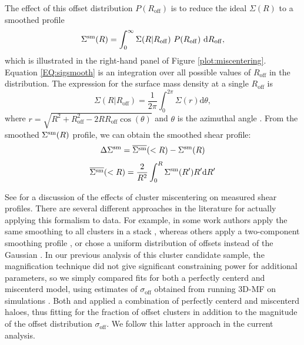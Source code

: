 The effect of this offset distribution $P(R_{\mathrm{off}})$ is to reduce the ideal $\Sigma(R)$ to a smoothed profile \citep[see e.g.][]{Johnston07,George12}
\begin{equation}
\label{EQ:sigsmooth}
\Sigma^{\rm sm}(R)=\int_{0}^{\infty} \Sigma(R|R_{\mathrm{off}})\ P(R_{\mathrm{off}})\ \mathrm{d}R_{\mathrm{off}},
\end{equation}
which is illustrated in the right-hand panel of Figure \ref{plot:miscentering}. Equation \ref{EQ:sigsmooth} is an integration over all possible values of $R_{\mathrm{off}}$ in the distribution. The expression for the surface mass density at a single $R_{\mathrm{off}}$ is
\begin{equation}
\Sigma(R|R_{\mathrm{off}})=\frac{1}{2\pi}\int_{0}^{2\pi}\Sigma(r) \mathrm{d}\theta,
\end{equation}
where $r = \sqrt{R^2+R_{\mathrm{off}}^2-2RR_{\mathrm{off}}\cos(\theta)}$ and $\theta$ is the azimuthal angle \citep{Yang06}. From the smoothed $\Sigma^{\rm sm}(R)$ profile, we can obtain the smoothed shear profile:
\begin{equation}
\Delta\Sigma^{\rm sm} = \overline{\Sigma^{\rm sm}}(<R) - \Sigma^{\rm sm}(R)
\end{equation}
\begin{equation}
\overline{\Sigma^{\rm sm}}(<R) = \frac{2}{R^2} \int_{0}^{R} \Sigma^{\rm sm}(R')R'\mathrm{d}R'
\end{equation}

See \citet{George12} for a discussion of the effects of cluster miscentering on measured shear profiles. There are several different approaches in the literature for actually applying this formalism to data. For example, in some work authors apply the same smoothing to all clusters in a stack \citep{George12}, whereas others apply a two-component smoothing profile \citep{Oguri14}, or chose a uniform distribution of offsets instead of the Gaussian \citep{Sehgal13}. In our previous analysis of this cluster candidate sample, the magnification technique did not give significant constraining power for additional parameters, so we simply compared fits for both a perfectly centerd and miscenterd model, using estimates of $\sigma_{\mathrm{off}}$ obtained from running \ac{3D-MF} on simulations \citep{Ford14}. Both \citet{Johnston07} and \citet{Covone14} applied a combination of perfectly centerd and miscenterd haloes, thus fitting for the fraction of offset clusters in addition to the magnitude of the offset distribution $\sigma_{\mathrm{off}}$. We follow this latter approach in the current analysis.

